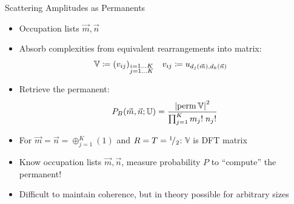 
\begin{frame}{Scattering Amplitudes as Permanents}
%
\begin{itemize}
\item Occupation lists $\vec{m}, \vec{n}$
\item Absorb complexities from equivalent rearrangements into matrix:
	\begin{align*}
			\mathbb{V}
		&\coloneqq
			\qty(v_{ij})_{\substack{
				i=1 \ldots K\\
				j=1 \ldots K
			}}
		&
			v_{ij}
		&\coloneqq
			u_{d_j(\vec{m}), d_k(\vec{n})}
	\end{align*}
\item Retrieve the permanent:
	\begin{equation*}
		P_B(\vec{m}, \vec{n}; \mathbb{U})
	=
		\frac
			{\qty|\operatorname{perm} \mathbb{V}|^2}
			{\prod_{j=1}^K m_j! \; n_j!}
	\end{equation*}
\item For $\vec{m} = \vec{n} = \oplus_{j=1}^K (1)$ and $R = T = {}^ {1} \!/_ {2}$: $\mathbb{V}$ is DFT matrix
\item[\Thus] Know occupation lists $\vec{m}, \vec{n}$, measure probability $P$ to \enquote{compute} the permanent!
\item Difficult to maintain coherence, but in theory possible for arbitrary sizes
\end{itemize}
%
\end{frame}


